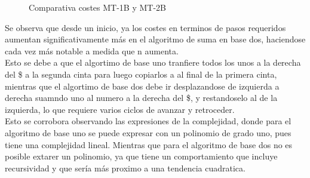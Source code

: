 \begin{figure}[h]
    \centering
    
    \caption{Comparativa costes MT-1B y MT-2B}
\end{figure}

Se observa que desde un inicio, ya los costes en terminos de pasos requeridos aumentan significativamente más en el algoritmo de suma en base dos, haciendose cada vez más notable a medida que n aumenta.\\ Esto se debe a que el algortimo de base uno tranfiere todos los unos a la derecha del \$ a la segunda cinta para luego copiarlos a al final de la primera cinta, mientras que el algortimo de base dos debe ir desplazandose de izquierda a derecha suamndo uno al numero a la derecha del \$, y restandoselo al de la izquierda, lo que requiere varios ciclos de avanzar y retroceder.\\
Esto se corrobora observando las expresiones de la complejidad, donde para el algoritmo de base uno se puede expresar con un polinomio de grado uno, pues tiene una complejidad lineal. Mientras que para el algoritmo de base dos no es posible extarer un polinomio, ya que tiene un comportamiento que incluye recursividad y que sería más proximo a una tendencia cuadratica.
